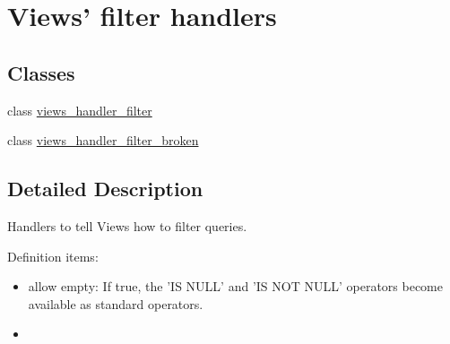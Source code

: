 \hypertarget{group__views__filter__handlers}{
\section{Views' filter handlers}
\label{group__views__filter__handlers}
}
\subsection*{Classes}
\begin{CompactItemize}
\item 
class \hyperlink{classviews__handler__filter}{views\_\-handler\_\-filter}
\item 
class \hyperlink{classviews__handler__filter__broken}{views\_\-handler\_\-filter\_\-broken}
\end{CompactItemize}


\subsection{Detailed Description}
Handlers to tell Views how to filter queries.

Definition items:\begin{itemize}
\item allow empty: If true, the 'IS NULL' and 'IS NOT NULL' operators become available as standard operators.\item \end{itemize}
